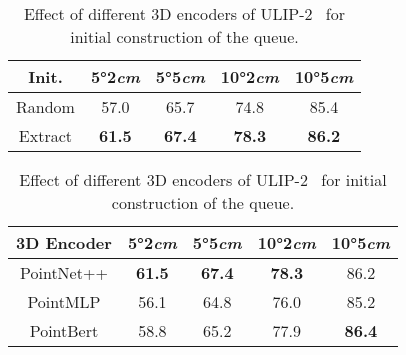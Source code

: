 \begin{table}[htbp]
    \small
    \centering
    \begin{subtable}[t]{1.0\linewidth}  %
        \centering
        \setlength\tabcolsep{9pt}%
        \begin{tabular}{c|cccc}
            \toprule
            Init. & 5°2\emph{cm} & 5°5\emph{cm} & 10°2\emph{cm}  & 10°5\emph{cm}\\
            \midrule
            Random  & 57.0          & 65.7    &74.8  &85.4   \\
            \rowcolor{mygray}
            Extract & \textbf{61.5}   &\textbf{67.4}    &\textbf{78.3} &\textbf{86.2}   \\
            \bottomrule
        \end{tabular}
        \caption{Effect of different queue initialization approaches}
        \label{tab:supp_ab_queue_init}
    \end{subtable}

    \vspace{0.2cm}  %

    \begin{subtable}[t]{1.0\linewidth}  %
        \centering
        \setlength\tabcolsep{7pt}%
        \begin{tabular}{c|cccc}
            \toprule
            3D Encoder & 5°2\emph{cm} & 5°5\emph{cm} & 10°2\emph{cm}  & 10°5\emph{cm}\\
            \midrule
            \rowcolor{mygray}
            PointNet++\cite{qi2017pointnet++} & \textbf{61.5}          &\textbf{67.4}    &\textbf{78.3} &86.2   \\
            PointMLP\cite{ma2022rethinking} & 56.1          &64.8   &76.0 &85.2   \\
            PointBert\cite{yu2022point} & 58.8          &65.2    &77.9 &\textbf{86.4}   \\
            \bottomrule
        \end{tabular}
        \caption{Effect of different 3D encoders of ULIP-2~\cite{xue2024ulip} for initial construction of the queue.}
        \label{tab:supp_queue_encoder}
    \end{subtable}

    \vspace{0.2cm}  %


\end{table}
